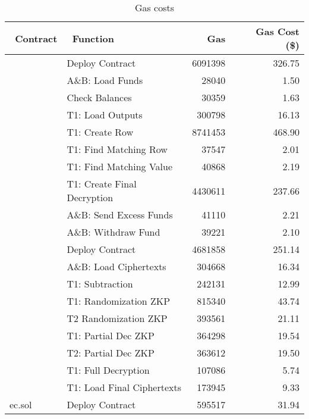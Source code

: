 \begin{table}[t]
		\centering
	\begin{tabular}{|l|l|r|r|}
		\hline
		~\textbf{Contract} & ~\textbf{Function } & ~\textbf{Gas}  & ~\textbf{Gas Cost (\$)}  \\ \hline
		\multirow{9}{*}{}  
		& Deploy Contract &6091398 & 326.75 \\ \cline{2-4} 
		& A\&B: Load Funds & 28040  &1.50  \\ \cline{2-4} 
		& Check Balances &  30359& 1.63 \\  \cline{2-4} 
		& T1: Load Outputs&  300798 & 16.13 \\  \cline{2-4} 
		& T1: Create Row & 8741453 & 468.90 \\  \cline{2-4}
		Mixmatch.sol	& T1: Find Matching Row & 37547 &2.01  \\  \cline{2-4}
		& T1: Find Matching Value &  40868&2.19 \\  \cline{2-4}
		& T1:  Create Final Decryption&  4430611& 237.66 \\  \cline{2-4}
		& A\&B: Send Excess Funds &  41110& 2.21 \\  \cline{2-4}
		&  A\&B:  Withdraw Fund&  39221& 2.10 \\   \hline
		\multirow{8}{*}{} 
		& Deploy Contract & 4681858&251.14 \\ \cline{2-4} 
		&   A\&B: Load Ciphertexts & 304668 & 16.34 \\  \cline{2-4}
		& T1: Subtraction & 242131 & 12.99\\  \cline{2-4}
		& T1: Randomization ZKP& 815340 &  43.74\\  \cline{2-4}
		PET.sol	&  T2 Randomization ZKP& 393561 &21.11  \\  \cline{2-4}
		& T1: Partial Dec ZKP& 364298 & 19.54\\  \cline{2-4}
		& T2: Partial Dec ZKP & 363612 & 19.50 \\  \cline{2-4}
		& T1: Full Decryption  &  107086& 5.74 \\  \cline{2-4}
		& T1:  Load Final Ciphertexts& 173945 & 9.33\\ \cline{1-4} 
	ec.sol	& Deploy Contract &595517 & 31.94 \\ \hline
	\end{tabular}
	\caption{Gas costs}
	 \label{tab:gascost}
\end{table}